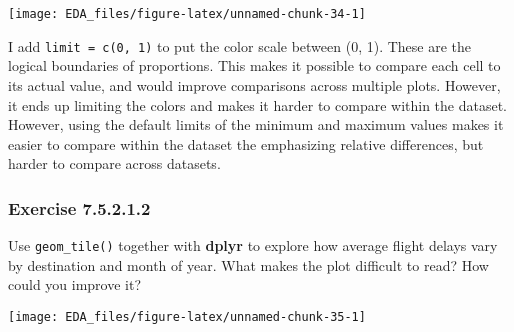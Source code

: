 \documentclass[]{book}
\newenvironment{Shaded}{\begin{snugshade}}{\end{snugshade}}
\newcommand{\DataTypeTok}[1]{\textcolor[rgb]{0.13,0.29,0.53}{#1}}
\newcommand{\KeywordTok}[1]{\textcolor[rgb]{0.13,0.29,0.53}{\textbf{#1}}}
\newcommand{\NormalTok}[1]{#1}
\newcommand{\OperatorTok}[1]{\textcolor[rgb]{0.81,0.36,0.00}{\textbf{#1}}}
\newcommand{\OtherTok}[1]{\textcolor[rgb]{0.56,0.35,0.01}{#1}}
\newcommand{\StringTok}[1]{\textcolor[rgb]{0.31,0.60,0.02}{#1}}
\theoremstyle{plain}
\theoremstyle{remark}
\begin{document}
\begin{center}\texttt{[image: EDA\_files/figure-latex/unnamed-chunk-34-1]} \end{center}

I add \texttt{limit\ =\ c(0,\ 1)} to put the color scale between (0, 1).
These are the logical boundaries of proportions. This makes it possible
to compare each cell to its actual value, and would improve comparisons
across multiple plots. However, it ends up limiting the colors and makes
it harder to compare within the dataset. However, using the default
limits of the minimum and maximum values makes it easier to compare
within the dataset the emphasizing relative differences, but harder to
compare across datasets.

\hypertarget{exercise-7.5.2.1.2}{%
\subsubsection*{\texorpdfstring{Exercise
{7.5.2.1.2}}{Exercise 7.5.2.1.2}}\label{exercise-7.5.2.1.2}}

Use \texttt{geom\_tile()} together with \textbf{dplyr} to explore how
average flight delays vary by destination and month of year. What makes
the plot difficult to read? How could you improve it?

\begin{Shaded}
\end{Shaded}

\begin{center}\texttt{[image: EDA\_files/figure-latex/unnamed-chunk-35-1]} \end{center}
\end{document}
